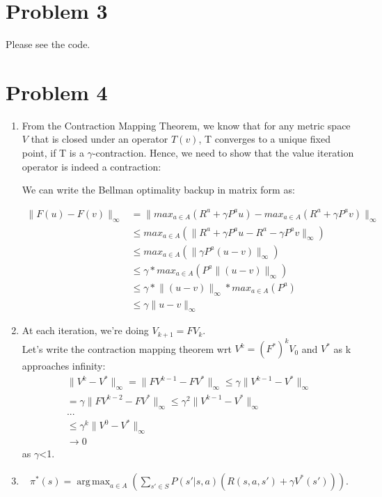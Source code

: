 \documentclass{article}
\DeclareMathOperator*{\argmax}{arg\,max}
\begin{document}
\section{Problem 3}
Please see the code.

\section{Problem 4}
\begin{enumerate}[label=(\alph*)]
\item From the Contraction Mapping Theorem, we know that for any metric space $V$ that is closed under an operator $T(v)$, T converges to a unique fixed point, if T is a $\gamma$-contraction.
Hence, we need to show that the value iteration operator is indeed a contraction:

We can write the Bellman optimality backup in matrix form as:

\begin{align*}
\lVert F(u)-F(v) \rVert_{\infty} &= \lVert max_{a \in A}(R^a+\gamma P^au) - max_{a \in A}(R^a+\gamma P^av) \rVert_{\infty}\\
&\leq  max_{a \in A}(\lVert R^a+\gamma P^au - R^a-\gamma P^av \rVert_{\infty})\\
&\leq max_{a \in A}(\lVert\gamma P^a (u-v)\rVert_{\infty})\\
&\leq \gamma * max_{a \in A}(P^a \lVert(u-v)\rVert_{\infty})\\
&\leq \gamma * \lVert(u-v)\rVert_{\infty} * max_{a \in A}(P^a)\\
&\leq \gamma \lVert u-v \rVert_{\infty}
\end{align*}
\item
At each iteration, we're doing $V_{k+1}=FV_k$.\\
Let's write the contraction mapping theorem wrt $V^k=(F^*)^kV_0$ and $V^*$ as k approaches infinity:
\begin{align*}
\lVert V^k- V^* \rVert_{\infty} 
= \lVert FV^{k-1}- FV^* \rVert_{\infty} \leq \gamma \lVert V^{k-1}- V^* \rVert_{\infty} \\
= \gamma \lVert FV^{k-2}- FV^* \rVert_{\infty}  \leq \gamma^2 \lVert V^{k-1}- V^* \rVert_{\infty} \\ ... \\
\leq \gamma^k \lVert V^{0}- V^* \rVert_{\infty} \\  \rightarrow 0 
\end{align*}
as $\gamma$<1.

\item \begin{align*}
  \pi ^*(s) = \argmax _{a \in A} 
    \left(
      \sum _{s' \in S} 
        P(s' | s, a) \left(
          R (s, a, s') + \gamma V ^*( s' )
        \right)
    \right) .
\end{align*}
\end{enumerate}
\end{document}
